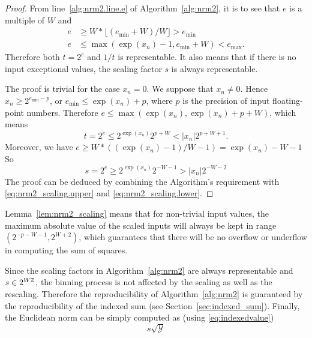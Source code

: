     \begin{proof}
         From line~\ref{alg:nrm2.line.e} of Algorithm~\ref{alg:nrm2}, it is to see that
         $e$ is a multiple of $W$ and
         \[
            \begin{aligned}
                e & \geq W * \lfloor(e_{\min} + W) / W\rfloor > e_{\min} \\
                e & \leq \max(\exp(x_n) - 1, e_{\min} + W) < e_{\max}.
            \end{aligned}
         \]
         Therefore both $t=2^e$ and $1/t$ is representable.
         It also means that if there is no input exceptional values, the scaling factor $s$ is always representable.

        The proof is trivial for the case $x_n = 0$. We suppose that $x_n \neq 0$.
        Hence $x_n \geq 2^{e_{\min} - p}$, or $e_{\min} \leq \exp(x_n) + p$,
        where $p$ is the precision of input floating-point numbers.
        Therefore $e \leq \max(\exp(x_n), \exp(x_n) + p + W)$,
        which means
        \begin{equation}
            t = 2^e \leq 2^{\exp(x_n)} 2^{p+W} < |x_n| 2^{p+W+1}.
            \label{eq:nrm2_scaling.upper}
        \end{equation}
        Moreover, we have
        \(
            e \geq W * ((\exp(x_n) -  1) / W - 1) = \exp(x_n) - W -1
        \)
        So 
        \begin{equation}
            s = 2^e \geq 2^{\exp(x_n)} 2^{- W - 1} > |x_n| 2^{-W-2}
            \label{eq:nrm2_scaling.lower}
        \end{equation}
        The proof can be deduced by combining the Algorithm's requirement
        with \eqref{eq:nrm2_scaling.upper} and \eqref{eq:nrm2_scaling.lower}.
    \end{proof}

    Lemma~\ref{lem:nrm2_scaling} means that 
    for non-trivial input values, the maximum absolute value of the scaled inputs
    will always be kept in range $(2^{-p-W-1}, 2^{W+2})$, which guarantees that
    there will be no overflow or underflow in computing the sum of squares.

    Since the scaling factors in Algorithm~\ref{alg:nrm2} are always representable and $s \in 2^{W\mathbb{Z}}$,
    the binning process is not affected by the scaling as well as the rescaling.
    Therefore the reproducibility of Algorithm~\ref{alg:nrm2} is guaranteed
    by the reproducibility of the indexed sum (see Section~\ref{sec:indexed_sum}).
    Finally, the Euclidean norm can be simply computed as (using \eqref{eq:indexedvalue})
    \begin{equation}
      s \sqrt{\mathcal{Y}}
    \end{equation}

